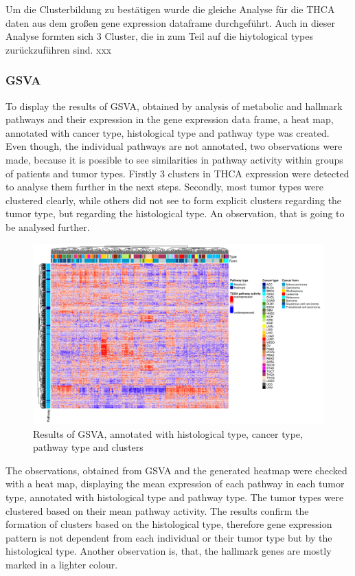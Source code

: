 \documentclass[
  parskip,
  oneside]{scrreprt}
\begin{document}
Um die Clusterbildung zu bestätigen wurde die gleiche Analyse für die
THCA daten aus dem großen gene expression dataframe durchgeführt. Auch
in dieser Analyse formten sich 3 Cluster, die in zum Teil auf die
hiytological types zurückzuführen sind. xxx

\hypertarget{gsva}{%
\subsubsection{GSVA}\label{gsva}}

To display the results of GSVA, obtained by analysis of metabolic and
hallmark pathways and their expression in the gene expression data
frame, a heat map, annotated with cancer type, histological type and
pathway type was created. Even though, the individual pathways are not
annotated, two observations were made, because it is possible to see
similarities in pathway activity within groups of patients and tumor
types. Firstly 3 clusters in THCA expression were detected to analyse
them further in the next steps. Secondly, most tumor types were
clustered clearly, while others did not see to form explicit clusters
regarding the tumor type, but regarding the histological type. An
observation, that is going to be analysed further.

\begin{figure}

{\centering \includegraphics[width=1\linewidth]{figures/GSVA Heatmap fertig} 

}

\caption{Results of GSVA, annotated with histological type, cancer type, pathway type and clusters}\label{fig:GSVAHeat}
\end{figure}

The observations, obtained from GSVA and the generated heatmap were
checked with a heat map, displaying the mean expression of each pathway
in each tumor type, annotated with histological type and pathway type.
The tumor types were clustered based on their mean pathway activity. The
results confirm the formation of clusters based on the histological
type, therefore gene expression pattern is not dependent from each
individual or their tumor type but by the histological type. Another
observation is, that, the hallmark genes are mostly marked in a lighter
colour.
\end{document}

